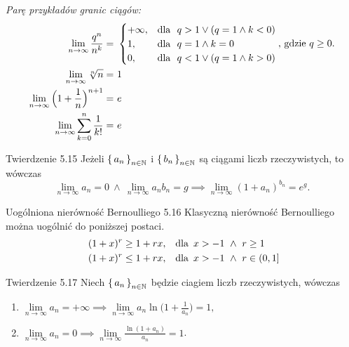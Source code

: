 \documentclass{article}
\newcommand{\hquad}{\mkern9mu}
\newcommand{\N}{\mathbb{N}}
\newcommand{\lin}[1]{\lim\limits_{n\to\infty}{#1}}
\newcommand{\seq}[1]{\set{#1_n}_{n\in\N}}
\begin{document}
\textit{Parę przykładów granic ciągów:}
\begin{align}
    \lin{\frac{q^n}{n^k}}=\ &
        \begin{cases}
            +\infty, &\text{dla }\ q>1 \lor(q=1\land k<0)\\
            1, &\text{dla }\ q=1\land k=0\\
            0, &\text{dla }\ q<1\lor(q=1\land k>0)
        \end{cases}\text{, gdzie }q\ge0.\\
    \lin{\sqrt[n]{n}}=\ &1\\
    \lin{\Bigl(1+\frac{1}{n} \Bigl)^{n+1}}=\ &e\\
    \lin{\sum_{k=0}^{n}\frac{1}{k!}}=\ &e
\end{align}\smallskip

\begin{twier}{Twierdzenie 5.15}
    Jeżeli $\seq{a}$ i $\seq{b}$ są ciągami liczb rzeczywistych, to wówczas
    \begin{equation*}
        \lin{a_n}=0\ \land\ \lin{a_n b_n}=g\implies \lin{(1+a_n)^{b_n}}=e^g.
    \end{equation*}
\end{twier}

\begin{twier}{Uogólniona nierówność Bernoulliego 5.16}
    Klasyczną nierówność Bernoulliego można uogólnić do poniższej postaci.
\begin{align*}
    (1+x)^r\ge1+rx,\quad&\text{dla}\hquad x>-1\ \land\ r\ge1\\\
    (1+x)^r\le1+rx,\quad&\text{dla}\hquad x>-1\ \land\ r\in(0,1]
\end{align*}
\end{twier}

\begin{twier}{Twierdzenie 5.17}
Niech $\seq{a}$ będzie ciagiem liczb rzeczywistych, wówczas
\begin{enumerate}[label=(\arabic*)]
    \item $\lin{a_n}=+\infty\implies\lin{a_n\ln{\bigl(1+\frac{1}{a_n}\bigl)}}=1,$
    \item $\lin{a_n}=0\implies\lin{\frac{\ln{(1+a_n)}}{a_n}}=1$.
\end{enumerate}
\end{twier}



                                                
\end{document}
